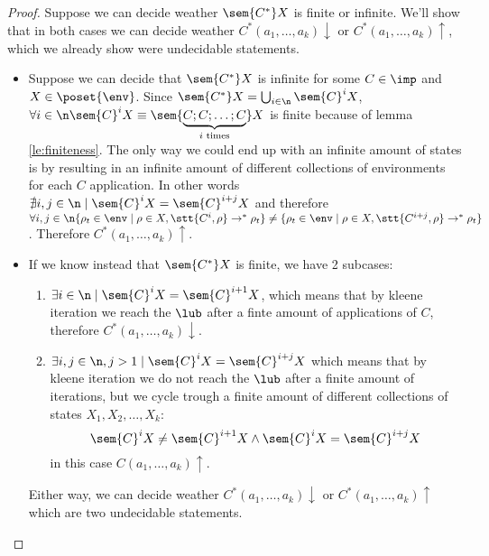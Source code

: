 \begin{proof}
  Suppose we can decide weather \(\sem{C^*}X\) is finite or
  infinite. We'll show that in both cases we can decide weather
  \(C^*(a_1, \dots, a_k)\downarrow\) or \(C^*(a_1, \dots,
  a_k)\uparrow\), which we already show were undecidable statements.
  \begin{itemize}
  \item Suppose we can decide that \(\sem{C^*}X\) is infinite for some
    \(C\in\imp\) and \(X\in\poset{\env}\). Since \(\sem{C^*}X =
    \bigcup_{i\in\n}\sem{C}^i X\), \(\forall i \in \n \sem{C}^i X
    \equiv \sem{\underbrace{C;C;\dots;C}_{i\text{ times}}}X\) is
    finite because of lemma \ref{le:finiteness}. The only way we could
    end up with an infinite amount of states is by resulting in an
    infinite amount of different collections of environments for each
    \(C\) application. In other words \(\nexists i,j \in \n \mid
    \sem{C}^i X = \sem{C}^{i+j}X\) and therefore \(\forall i,j\in\n
    \{\rho_t \in \env \mid \rho \in X , \stt{C^i, \rho} \to^* \rho_t\}
    \neq \{\rho_t \in \env \mid \rho \in X , \stt{C^{i+j}, \rho} \to^*
    \rho_t\}\). Therefore \(C^*(a_1, \dots, a_k)\uparrow\).
  \item If we know instead that \(\sem{C^*}X\) is finite, we have 2
    subcases:
    \begin{enumerate}
    \item \(\exists i \in\n \mid \sem{C}^iX = \sem{C}^{i+1}X\), which
      means that by kleene iteration we reach the \(\lub\) after a
      finte amount of applications of \(C\), therefore \(C^*(a_1,
      \dots, a_k)\downarrow\).
    \item \(\exists i,j \in \n, j > 1 \mid \sem{C}^iX = \sem{C}^{i +
      j}X\) which means that by kleene iteration we do not reach the
      \(\lub\) after a finite amount of iterations, but we cycle
      trough a finite amount of different collections of states \(X_1,
      X_2, \dots, X_k\): \[\sem{C}^iX \neq \sem{C}^{i+1}X \wedge
      \sem{C}^iX = \sem{C}^{i+j}X\] in this case \(C(a_1, \dots,
      a_k)\uparrow\).
    \end{enumerate}

    Either way, we can decide weather \(C^*(a_1, \dots, a_k)
    \downarrow\) or \(C^*(a_1, \dots, a_k) \uparrow\) which are two
    undecidable statements.
  \end{itemize}
\end{proof}

